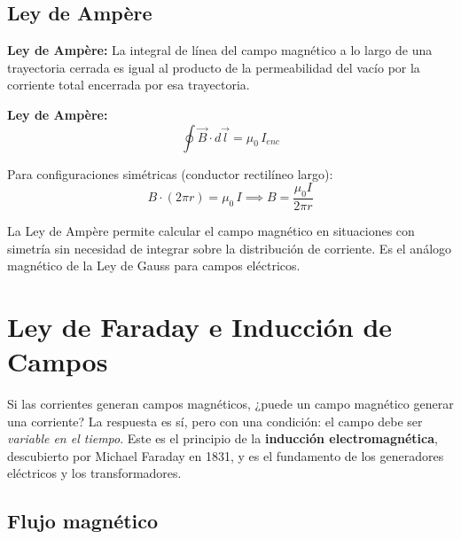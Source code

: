 \subsection{Ley de Ampère}

\begin{seccion}
\begin{definicion}
\textbf{Ley de Ampère:} La integral de línea del campo magnético a lo largo de una trayectoria cerrada es igual al producto de la permeabilidad del vacío por la corriente total encerrada por esa trayectoria.
\end{definicion}

\begin{ecuacion}
\textbf{Ley de Ampère:}
$$\oint \vec{B} \cdot d\vec{l} = \mu_0 \, I_{enc}$$

Para configuraciones simétricas (conductor rectilíneo largo):
$$B \cdot (2\pi r) = \mu_0 \, I \implies B = \frac{\mu_0 I}{2\pi r}$$
\end{ecuacion}

\begin{nota}
La Ley de Ampère permite calcular el campo magnético en situaciones con simetría sin necesidad de integrar sobre la distribución de corriente. Es el análogo magnético de la Ley de Gauss para campos eléctricos.
\end{nota}
\end{seccion}

\section{Ley de Faraday e Inducción de Campos}

\begin{seccion}
Si las corrientes generan campos magnéticos, ¿puede un campo magnético generar una corriente? La respuesta es sí, pero con una condición: el campo debe ser \textit{variable en el tiempo}. Este es el principio de la \textbf{inducción electromagnética}, descubierto por Michael Faraday en 1831, y es el fundamento de los generadores eléctricos y los transformadores.
\end{seccion}

\subsection{Flujo magnético}

